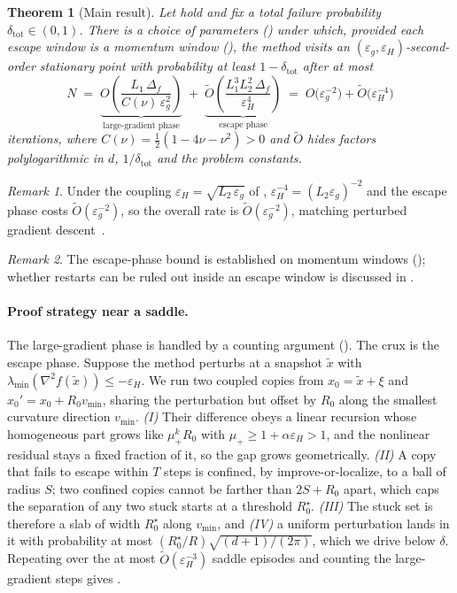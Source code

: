 \documentclass[11pt]{article}
\theoremstyle{plain}
\newtheorem{theorem}{Theorem}[section]
\theoremstyle{definition}
\theoremstyle{remark}
\newtheorem{remark}{Remark}[section]
\newcommand{\lmin}{\lambda_{\min}}
\newcommand{\Hess}{\nabla^2}
\newcommand{\eps}{\varepsilon}
\newcommand{\epsg}{\eps_{g}}
\newcommand{\epsH}{\eps_{H}}
\newcommand{\mup}{\mu_{+}}
\newcommand{\xt}{\tilde{x}}
\newcommand{\Rstar}{R_{0}^{\star}}
\newcommand{\Otil}{\widetilde{O}}
\begin{document}
\begin{theorem}[Main result]
\label{thm:main}
Let  hold and fix a total
failure probability $\delta_{\mathrm{tot}}\in(0,1)$. There is a choice of
parameters () under which, provided each escape window is a momentum window
(), the method visits
an $(\epsg,\epsH)$-second-order stationary point with probability at
least $1-\delta_{\mathrm{tot}}$ after at most
\[
  N \;=\;
  \underbrace{O\!\left(\frac{L_{1}\,\Delta_{f}}{C(\nu)\,\epsg^{2}}\right)}_{
      \text{large-gradient phase}}
  \;+\;
  \underbrace{\Otil\!\left(\frac{L_{1}^{3}L_{2}^{2}\,\Delta_{f}}{\epsH^{4}}\right)}_{
      \text{escape phase}}
  \;=\;
  O\!\big(\epsg^{-2}\big)+\Otil\!\big(\epsH^{-4}\big)
\]
iterations, where $C(\nu)=\tfrac{1}{2}(1-4\nu-\nu^{2})>0$ and $\Otil$
hides factors polylogarithmic in $d$, $1/\delta_{\mathrm{tot}}$ and the
problem constants.
\end{theorem}

\begin{remark}
Under the coupling $\epsH=\sqrt{L_{2}\,\epsg}$ of ,
$\epsH^{-4}=(L_{2}\epsg)^{-2}$ and the escape phase costs
$\Otil(\epsg^{-2})$, so the overall rate is $\Otil(\epsg^{-2})$,
matching perturbed gradient descent~\cite[Theorem 7]{pmlr-v70-jin17a}.
\end{remark}

\begin{remark}
The escape-phase bound is established on momentum windows
(); whether restarts can be ruled out inside an escape
window is discussed in .
\end{remark}

\paragraph{Proof strategy near a saddle.}
The large-gradient phase is handled by a counting argument
(). The crux is the escape phase. Suppose the
method perturbs at a snapshot $\xt$ with
$\lmin(\Hess f(\xt))\le-\epsH$. We run two coupled copies from
$x_{0}=\xt+\xi$ and $x_{0}'=x_{0}+R_{0}v_{\min}$, sharing the
perturbation but offset by $R_{0}$ along the smallest curvature
direction $v_{\min}$. \emph{(I)} Their difference obeys a linear
recursion whose homogeneous part grows like $\mup^{k}R_{0}$ with
$\mup\ge1+\alpha\epsH>1$, and the nonlinear residual stays a fixed
fraction of it, so the gap grows geometrically. \emph{(II)} A copy that
fails to escape within $T$ steps is confined, by improve-or-localize, to
a ball of radius $S$; two confined copies cannot be farther than
$2S+R_{0}$ apart, which caps the separation of any two stuck starts at a
threshold $\Rstar$. \emph{(III)} The stuck set is therefore a slab of
width $\Rstar$ along $v_{\min}$, and \emph{(IV)} a uniform perturbation
lands in it with probability at most
$(\Rstar/R)\sqrt{(d+1)/(2\pi)}$, which we drive below $\delta$.
Repeating over the at most $\Otil(\epsH^{-3})$ saddle episodes and
counting the large-gradient steps gives .
\end{document}
